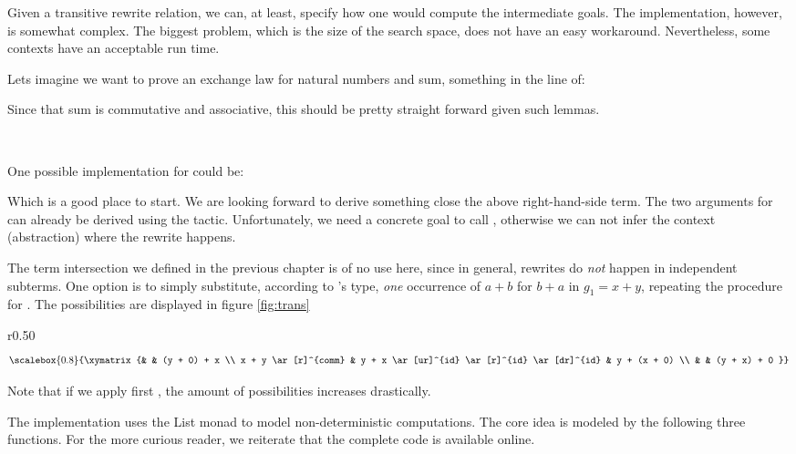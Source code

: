 Given a transitive rewrite relation, we can, at least, specify how one would
compute the intermediate goals. The implementation, however, is somewhat complex. 
The biggest problem, which is the size of the search space,
does not have an easy workaround. Nevertheless, some contexts have an acceptable run time. 

Lets imagine we want to prove an exchange law for natural numbers and sum, something
in the line of:


Since that sum is commutative and associative, this should be pretty straight forward
given such lemmas.

\\

One possible implementation for  could be:


Which is a good place to start. We are looking forward to derive something close the above
right-hand-side term. The two arguments for  can already be derived using the 
tactic. Unfortunately, we need a concrete goal to call , otherwise we can not infer the
context (abstraction) where the rewrite happens.

The term intersection we defined in the previous chapter is of no use here, since in general,
rewrites do \emph{not} happen in independent subterms. One option is to simply substitute, according
to 's type, \emph{one} occurrence of $a + b$ for $b + a$ in $g_1 = x + y$, repeating
the procedure for . The possibilities are displayed in figure \ref{fig:trans}

\begin{wrapfigure}{r}{0.50\textwidth}
\begin{displaymath}
\scalebox{0.8}{%
\xymatrix{%
  & & (y + 0) + x \\
x + y \ar[r]^{comm} & y + x \ar[ur]^{id} \ar[r]^{id} \ar[dr]^{id} & y + (x + 0) \\
& & (y + x) + 0
}}
\end{displaymath}
\caption{Substitution outcomes}
\label{fig:trans}
\end{wrapfigure}

Note that if we apply first , the amount of possibilities increases drastically.

The implementation uses the List monad to model non-deterministic computations. The core idea
is modeled by the following three functions. For the more curious reader, we reiterate that
the complete code is available online.

